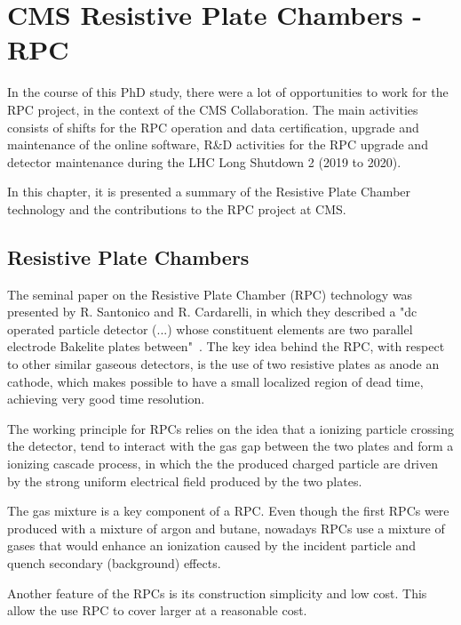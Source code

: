 \chapter{CMS Resistive Plate Chambers - RPC}


In the course of this PhD study, there were a lot of opportunities to work for the RPC project, in the context of the CMS Collaboration. The main activities consists of shifts for the RPC operation and data certification, upgrade and maintenance of the online software, R\&D activities for the RPC upgrade and detector maintenance during the LHC Long Shutdown 2 (2019 to 2020).

In this chapter, it is presented a summary of the Resistive Plate Chamber technology and the contributions to the RPC project at CMS.

\section{Resistive Plate Chambers}

The seminal paper on the Resistive Plate Chamber (RPC) technology was presented by R. Santonico and R. Cardarelli, in which they described a "dc operated particle detector (...) whose constituent elements are two parallel electrode Bakelite plates between"~\cite{rpc_seminal}. The key idea behind the RPC, with respect to other similar gaseous detectors, is the use of two resistive plates as anode an cathode, which makes possible to have a small localized region of dead time, achieving very good time resolution. 

The working principle for RPCs relies on the idea that a ionizing particle crossing the detector, tend to interact with the gas gap between the two plates and form a ionizing cascade process, in which the the produced charged particle are driven by the strong uniform electrical field produced by the two plates.

The gas mixture is a key component of a RPC. Even though the first RPCs were produced with a mixture of argon and butane, nowadays RPCs use a mixture of gases that would enhance an ionization caused by the incident particle and quench secondary (background) effects.

Another feature of the RPCs is its construction simplicity and low cost. This allow the use RPC to cover larger at a reasonable cost. 

